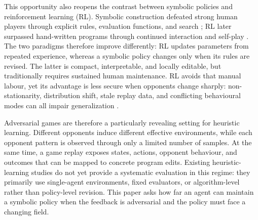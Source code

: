 This opportunity also reopens the contrast between symbolic policies and reinforcement
learning (RL). Symbolic construction defeated strong human players through explicit
rules, evaluation functions, and search \citep{deepblue2002}; RL later surpassed
hand-written programs through continued interaction and self-play
\citep{alphazero2018,alphastar2019,openaifive2019}. The two paradigms therefore
improve differently: RL updates parameters from repeated experience, whereas a
symbolic policy changes only when its rules are revised. The latter is compact,
interpretable, and locally editable, but traditionally requires sustained human
maintenance. RL avoids that manual labour, yet its advantage is less secure when
opponents change sharply: non-stationarity, distribution shift, stale replay data,
and conflicting behavioural modes can all impair generalization
\citep{hernandezleal2019survey,zhang2018overfitting,cobbe2019quantifying,
gleave2021adversarial,eysenbach2019diversity,yu2020metaworld}.

Adversarial games are therefore a particularly revealing setting for heuristic
learning. Different opponents induce different effective environments, while each
opponent pattern is observed through only a limited number of samples. At the same
time, a game replay exposes states, actions, opponent behaviour, and outcomes that can
be mapped to concrete program edits. Existing heuristic-learning studies do not yet
provide a systematic evaluation in this regime: they primarily use single-agent
environments, fixed evaluators, or algorithm-level rather than policy-level revision.
This paper asks how far an agent can maintain a symbolic policy when the feedback is
adversarial and the policy must face a changing field.


